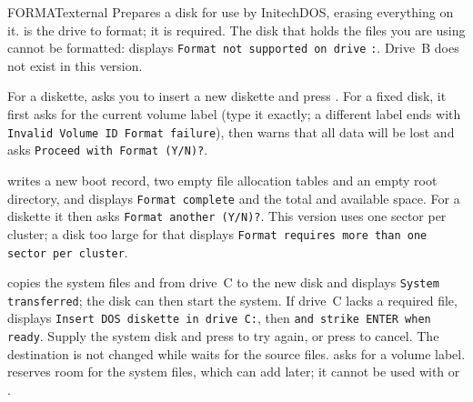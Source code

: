 \begin{DosEntry}{FORMAT}{}{external}
\Purpose Prepares a disk for use by InitechDOS, erasing everything on it.
\Format {}
\Remarks
{} is the drive to format; it is required.  The disk that holds the
files you are using cannot be formatted:  displays
\texttt{Format not supported on drive} \texttt{:}.  Drive~B does not
exist in this version.

For a diskette,  asks you to insert a new diskette and press
.  For a fixed disk, it first asks for the current volume label
(type it exactly; a different label ends  with
\texttt{Invalid Volume ID Format failure}), then warns that all data will
be lost and asks \texttt{Proceed with Format (Y/N)?}.

 writes a new boot record, two empty file allocation tables and
an empty root directory, and displays \texttt{Format complete} and the
total and available space.  For a diskette it then asks
\texttt{Format another (Y/N)?}.  This version uses one sector per cluster;
a disk too large for that displays \texttt{Format requires more than one
sector per cluster}.

 copies the system files and  from drive~C to
the new disk and displays \texttt{System transferred}; the disk can then
start the system.  If drive~C lacks a required file,  displays
\texttt{Insert DOS diskette in drive C:}, then
\texttt{and strike ENTER when ready}.  Supply the system disk and press
 to try again, or press  to cancel.  The destination
is not changed while  waits for the source files.
 asks for a volume label.   reserves
room for the system files, which  can add later; it cannot be used
with  or .


\end{DosEntry}
